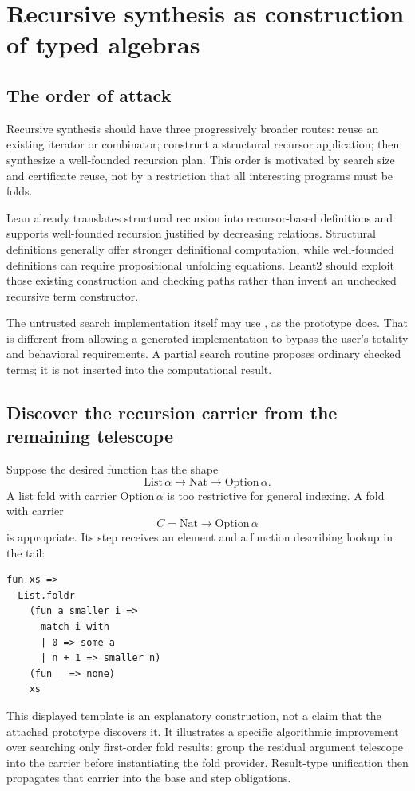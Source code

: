 \section{Recursive synthesis as construction of typed algebras}
\label{sec:recursion}
\subsection{The order of attack}
Recursive synthesis should have three progressively broader routes: reuse an existing iterator or combinator; construct a structural recursor application; then synthesize a well-founded recursion plan. This order is motivated by search size and certificate reuse, not by a restriction that all interesting programs must be folds.

Lean already translates structural recursion into recursor-based definitions and supports well-founded recursion justified by decreasing relations. Structural definitions generally offer stronger definitional computation, while well-founded definitions can require propositional unfolding equations. Leant2 should exploit those existing construction and checking paths rather than invent an unchecked recursive term constructor.\cite{recursion}

The untrusted search implementation itself may use , as the prototype does. That is different from allowing a generated implementation to bypass the user's totality and behavioral requirements. A partial search routine proposes ordinary checked terms; it is not inserted into the computational result.

\subsection{Discover the recursion carrier from the remaining telescope}
Suppose the desired function has the shape
\[
 \mathrm{List}\,\alpha\to\mathrm{Nat}\to\mathrm{Option}\,\alpha.
\]
A list fold with carrier $\mathrm{Option}\,\alpha$ is too restrictive for general indexing. A fold with carrier
\[
 C=\mathrm{Nat}\to\mathrm{Option}\,\alpha
\]
is appropriate. Its step receives an element and a function describing lookup in the tail:
\begin{lstlisting}[caption={A reference fold template for zero-based lookup; proposed search can discover the carrier from the target telescope.}]
fun xs =>
  List.foldr
    (fun a smaller i =>
      match i with
      | 0 => some a
      | n + 1 => smaller n)
    (fun _ => none)
    xs
\end{lstlisting}
This displayed template is an explanatory construction, not a claim that the attached prototype discovers it. It illustrates a specific algorithmic improvement over searching only first-order fold results: group the residual argument telescope into the carrier before instantiating the fold provider. Result-type unification then propagates that carrier into the base and step obligations.

